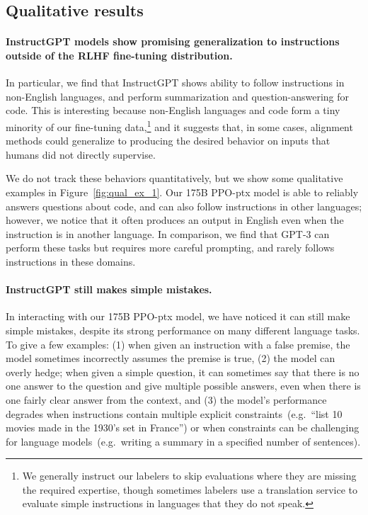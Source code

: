 \subsection{Qualitative results}
\label{sec:results-qual}

\paragraph{InstructGPT models show promising generalization to instructions outside of the RLHF fine-tuning distribution.} In particular, we find that InstructGPT shows ability to follow instructions in non-English languages, and perform summarization and question-answering for code. This is interesting because non-English languages and code form a tiny minority of our fine-tuning data,\footnote{We generally instruct our labelers to skip evaluations where they are missing the required expertise, though sometimes labelers use a translation service to evaluate simple instructions in languages that they do not speak. } and it suggests that, in some cases, alignment methods could generalize to producing the desired behavior on inputs that humans did not directly supervise.

We do not track these behaviors quantitatively, but we show some qualitative examples in Figure~\ref{fig:qual_ex_1}. Our 175B PPO-ptx model is able to reliably answers questions about code, and can also follow instructions in other languages; however, we notice that it often produces an output in English even when the instruction is in another language. In comparison, we find that GPT-3 can perform these tasks but requires more careful prompting, and rarely follows instructions in these domains.

\paragraph{InstructGPT still makes simple mistakes.} In interacting with our 175B PPO-ptx model, we have noticed it can still make simple mistakes, despite its strong performance on many different language tasks. To give a few examples: (1) when given an instruction with a false premise, the model sometimes incorrectly assumes the premise is true, (2) the model can overly hedge; when given a simple question, it can sometimes say that there is no one answer to the question and give multiple possible answers, even when there is one fairly clear answer from the context, and (3) the model's performance degrades when instructions contain multiple explicit constraints~(e.g.\ ``list 10 movies made in the 1930's set in France'') or when constraints can be challenging for language models~(e.g.\ writing a summary in a specified number of sentences).

